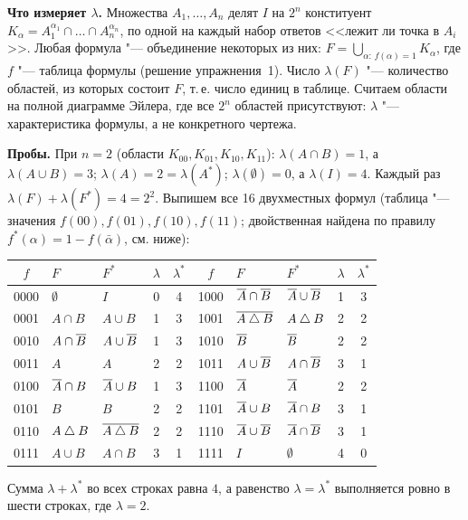 \begin{solution}[7 (\S\,3)]
\textbf{Что измеряет $\lambda$.} Множества $A_1,\dots,A_n$ делят $I$ на $2^n$
конституент $K_\alpha=A_1^{\alpha_1}\cap\dots\cap A_n^{\alpha_n}$, по одной на
каждый набор ответов <<лежит ли точка в $A_i$>>. Любая формула "--- объединение
некоторых из них: $F=\bigcup_{\alpha:\,f(\alpha)=1}K_\alpha$, где $f$ "---
таблица формулы (решение упражнения~1). Число $\lambda(F)$ "--- количество
областей, из которых состоит $F$, т.\,е. число единиц в таблице. Считаем
области на полной диаграмме Эйлера, где все $2^n$ областей присутствуют:
$\lambda$ "--- характеристика формулы, а не конкретного чертежа.

\textbf{Пробы.} При $n=2$ (области $K_{00},K_{01},K_{10},K_{11}$):
$\lambda(A\cap B)=1$, а $\lambda(A\cup B)=3$; $\lambda(A)=2=\lambda(A^*)$;
$\lambda(\emptyset)=0$, а $\lambda(I)=4$. Каждый раз
$\lambda(F)+\lambda(F^*)=4=2^2$. Выпишем все 16 двухместных формул
(таблица "--- значения $f(00),f(01),f(10),f(11)$; двойственная найдена по
правилу $f^*(\alpha)=1-f(\bar\alpha)$, см. ниже):
\begin{center}\small
\begin{tabular}{@{}cllcc@{\qquad}cllcc@{}}
\toprule
$f$ & $F$ & $F^*$ & $\lambda$ & $\lambda^*$ & $f$ & $F$ & $F^*$ & $\lambda$ & $\lambda^*$\\ \midrule
0000 & $\emptyset$ & $I$ & 0 & 4 & 1000 & $\overline{A}\cap\overline{B}$ & $\overline{A}\cup\overline{B}$ & 1 & 3\\
0001 & $A\cap B$ & $A\cup B$ & 1 & 3 & 1001 & $\overline{A\mathbin{\triangle} B}$ & $A\mathbin{\triangle} B$ & 2 & 2\\
0010 & $A\cap\overline{B}$ & $A\cup\overline{B}$ & 1 & 3 & 1010 & $\overline{B}$ & $\overline{B}$ & 2 & 2\\
0011 & $A$ & $A$ & 2 & 2 & 1011 & $A\cup\overline{B}$ & $A\cap\overline{B}$ & 3 & 1\\
0100 & $\overline{A}\cap B$ & $\overline{A}\cup B$ & 1 & 3 & 1100 & $\overline{A}$ & $\overline{A}$ & 2 & 2\\
0101 & $B$ & $B$ & 2 & 2 & 1101 & $\overline{A}\cup B$ & $\overline{A}\cap B$ & 3 & 1\\
0110 & $A\mathbin{\triangle} B$ & $\overline{A\mathbin{\triangle} B}$ & 2 & 2 & 1110 & $\overline{A}\cup\overline{B}$ & $\overline{A}\cap\overline{B}$ & 3 & 1\\
0111 & $A\cup B$ & $A\cap B$ & 3 & 1 & 1111 & $I$ & $\emptyset$ & 4 & 0\\
\bottomrule
\end{tabular}
\end{center}
Сумма $\lambda+\lambda^*$ во всех строках равна $4$, а равенство
$\lambda=\lambda^*$ выполняется ровно в шести строках, где $\lambda=2$.


\end{solution}
